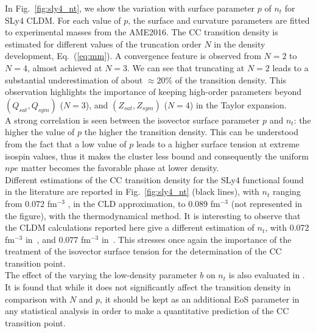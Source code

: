 In Fig.~\ref{fig:sly4_nt}, we show the variation with surface parameter $p$ of 
$n_t$ for SLy4 CLDM. For each value of $p$, the surface and curvature 
parameters are fitted to experimental masses from the AME2016. 
The CC transition density is estimated for different 
values of the truncation order $N$ in the density development, 
Eq.~(\ref{eq:mm}). A convergence feature is observed from $N=2$ to $N=4$,
almost achieved at $N=3$. We can see that truncating at $N=2$ leads to a 
substantial underestimation of about $\approx 20\%$ of the transition density. 
This observation highlights the importance of keeping high-order 
parameters beyond $(Q_{sat},Q_{sym})$ ($N=3$), and $(Z_{sat},Z_{sym})$ ($N=4$)
in the Taylor expansion.\\
A strong correlation is seen between the isovector surface parameter $p$ and $n_t$: the
higher the value of $p$ the higher the transition density. This can be
understood from the fact that a low value of $p$ leads to a higher surface 
tension at extreme isospin values, thus it makes the cluster less bound and
consequently the uniform ${npe}$ matter becomes the favorable phase at lower
density.\\
Different estimations of the CC transition density for the SLy4 functional
found in the literature are reported in Fig.~\ref{fig:sly4_nt} (black lines), 
with $n_t$ ranging from 0.072 fm$^{-3}$ \cite{Vinas2017}, in the 
CLD approximation, to 0.089 fm$^{-3}$ \cite{Ducoin2011} (not represented in the 
figure), with the thermodynamical method. It is interesting to observe that 
the CLDM calculations reported here give a different estimation of $n_t$, with
0.072 fm$^{-3}$ in~\cite{Vinas2017}, and 0.077 fm$^{-3}$
in~\cite{Douchin2000a}. This stresses once again the importance of the
treatment of the isovector surface tension for the determination of the CC 
transition point.\\
The effect of the varying the low-density parameter $b$ on $n_t$ is also 
evaluated in \cite{Carreau2019cc}. It is found that while it does not 
significantly affect the transition density in comparison with $N$ and $p$, it 
should be kept as an additional EoS parameter in any statistical analysis in
order to make a quantitative prediction of the CC transition point.

